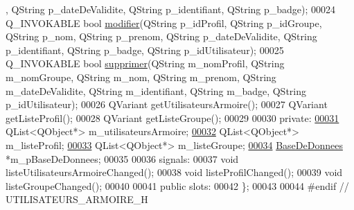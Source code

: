 \begin{DoxyCode}
      , QString p\_dateDeValidite, QString p\_identifiant, QString p\_badge);
00024     Q\_INVOKABLE \textcolor{keywordtype}{bool} \hyperlink{class_utilisateurs_armoire_affd91d7591d57b8dafc098f09b9319aa}{modifier}(QString p\_idProfil, QString p\_idGroupe, QString p\_nom, QString 
      p\_prenom, QString p\_dateDeValidite, QString p\_identifiant, QString p\_badge, QString p\_idUtilisateur);
00025     Q\_INVOKABLE \textcolor{keywordtype}{bool} \hyperlink{class_utilisateurs_armoire_a035d7ca496ddaaf83467934fbd694883}{supprimer}(QString m\_nomProfil, QString m\_nomGroupe, QString m\_nom, QString 
      m\_prenom, QString m\_dateDeValidite, QString m\_identifiant, QString m\_badge, QString p\_idUtilisateur);
00026     QVariant getUtilisateursArmoire();
00027     QVariant getListeProfil();
00028     QVariant getListeGroupe();
00029 
00030 private:
\hyperlink{class_utilisateurs_armoire_aade1e94417c9729b9e8cadaf19e3227d}{00031}     QList<QObject*> m\_utilisateursArmoire;
\hyperlink{class_utilisateurs_armoire_a0687ace99585d71b2636feaf2163b905}{00032}     QList<QObject*> m\_listeProfil;
\hyperlink{class_utilisateurs_armoire_a85558a0f373c06315c3c5f2e4e9e660c}{00033}     QList<QObject*> m\_listeGroupe;
\hyperlink{class_utilisateurs_armoire_ac43b4894f5036117d044ad2d22b09318}{00034}     \hyperlink{class_base_de_donnees}{BaseDeDonnees} *m\_pBaseDeDonnees;
00035 
00036 signals:
00037     \textcolor{keywordtype}{void} listeUtilisateursArmoireChanged();
00038     \textcolor{keywordtype}{void} listeProfilChanged();
00039     \textcolor{keywordtype}{void} listeGroupeChanged();
00040 
00041 public slots:
00042 \};
00043 
00044 \textcolor{preprocessor}{#endif // UTILISATEURS\_ARMOIRE\_H}
\end{DoxyCode}
